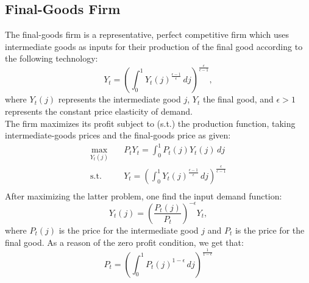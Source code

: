 \documentclass[11pt, a4paper, leqno]{article}
\begin{document}
\subsection{Final-Goods Firm}
The final-goods firm is a representative, perfect competitive firm which uses intermediate goods as inputs for their production of the final good according to the following technology:
\begin{equation}
	Y_{t} = \left( \int_{0}^{1} Y_{t}(j)^{\frac{\epsilon -1}{\epsilon}} \,dj \right)^{\frac{\epsilon}{\epsilon -1}},
\end{equation}
where $Y_{t}(j)$ represents the intermediate good $j$, $Y_{t}$ the final good, and $\epsilon >1$ represents the constant price elasticity of demand.\\
The firm maximizes its profit subject to (s.t.) the production function, taking intermediate-goods prices and the final-goods price as given:
\begin{equation*}
	\begin{aligned}
		\max_{Y_{t}(j)} \quad & P_{t}Y_{t} = \int_{0}^{1} P_{t}(j)Y_{t}(j) \,dj\\
		\textrm{s.t.} \quad & Y_{t} = \left( \int_{0}^{1} Y_{t}(j)^{\frac{\epsilon -1}{\epsilon}} \,dj \right)^{\frac{\epsilon}{\epsilon -1}} \\
	\end{aligned}
\end{equation*}
After maximizing the latter problem, one find the input demand function:
\begin{equation}
		Y_{t}(j) = \left( \frac{P_{t}(j)}{P_{t}} \right)^{- \epsilon} Y_{t},
\end{equation}
where $P_{t}(j)$ is the price for the intermediate good $j$ and $P_{t}$ is the price for the final good.
As a reason of the zero profit condition, we get that:
\begin{equation}
		P_{t} = \left( \int_{0}^{1} P_{t}(j)^{1- \epsilon} \,dj \right)^{ \frac{1}{1- \epsilon}}
\end{equation}
\end{document}
